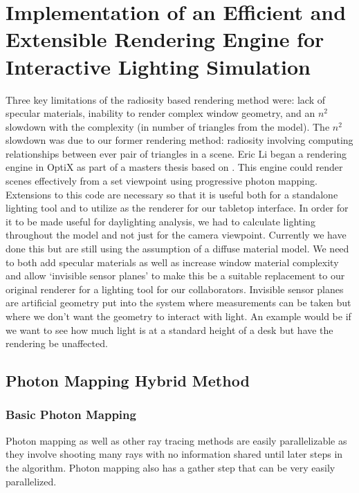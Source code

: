 \chapter{Implementation of an Efficient and Extensible Rendering Engine for Interactive Lighting Simulation}


Three key limitations of the radiosity based rendering method were: lack of specular materials, inability to render complex window geometry, and an $n^2$ slowdown with the complexity (in number of triangles from the model).  The $n^2$ slowdown was due to our former rendering method: radiosity involving computing relationships between ever pair of triangles in a scene.   Eric Li began a rendering engine in OptiX as part of a masters thesis\cite{LiThesis} based on \cite{McGuire:2009:HGI:1572769.1572783}.  This engine could render scenes effectively from a set viewpoint using progressive photon mapping.  Extensions to this code are necessary so that it is useful both for a standalone lighting tool and to utilize as the renderer for our tabletop interface.  In order for it to be made useful for daylighting analysis, we had to calculate lighting throughout the model and not just for the camera viewpoint.  Currently we have done this but are still using the assumption of a diffuse material model.  We need to both add specular materials as well as increase window material complexity and allow ‘invisible sensor planes’ to make this be a suitable replacement to our original renderer for a lighting tool for our collaborators.  Invisible sensor planes are artificial geometry put into the system where measurements can be taken but where we don’t want the geometry to interact with light.  An example would be if we want to see how much light is at a standard height of a desk but have the rendering be unaffected.


\section{Photon Mapping Hybrid Method}

  \subsection{Basic Photon Mapping}
    Photon mapping as well as other ray tracing methods are easily parallelizable as they involve shooting many rays with no information shared until later steps in the algorithm.  Photon mapping also has a gather step that can be very easily parallelized.
